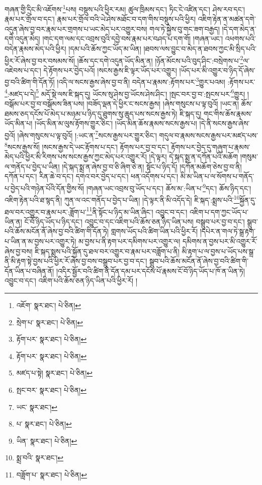 གཞན་གྱི་དྲིང་མི་འཇོགས་\footnote{འཇོག་  སྣར་ཐང་།  པེ་ཅིན། }པས། བསྡུས་པའི་ཕྱིར་རམ། ཚུལ་ཁྲིམས་དང་། ཏིང་ངེ་འཛིན་དང་། ཤེས་རབ་དང་། རྣམ་པར་གྲོལ་བ་དང་། རྣམ་པར་གྲོལ་བའི་ཡེ་ཤེས་མཐོང་བ་དག་གིས་བསྡུས་པའི་ཕྱིར། འཇིག་རྟེན་ན་མཚན་དགེ་འདུན་ཞེས་བྱ་བར་རྣམ་པར་གྲགས་པ་ཡང་མེད་པར་འགྱུར་བས། གལ་ཏེ་སྐྱེས་བུ་གང་ཟག་བརྒྱད། །དེ་དག་མེད་ན་དགེ་འདུན་མེད། །གང་དག་ལམ་དང་འབྲས་བུའི་དབྱེ་བས་རྣམ་པར་བཤད་པ་དག་གོ། །གཞན་ཡང་། འཕགས་པའི་བདེན་རྣམས་མེད་པའི་ཕྱིར། །དམ་པའི་ཆོས་ཀྱང་ཡོད་མ་ཡིན། །ཐབས་ལས་བྱུང་བ་མེད་ན་ཐབས་ཀྱང་མི་སྲིད་པའི་ཕྱིར་རོ་ཞེས་བྱ་བར་བསམས་སོ། །ཆོས་དང་དགེ་འདུན་ཡོད་མིན་ན། །ཉོན་མོངས་པའི་བུད་ཤིང་:བསྲེགས་པ་\footnote{སྲེག་པ་  སྣར་ཐང་།  པེ་ཅིན། }ལ་འཇེབས་པ་དང་། དེ་རྟོགས་པར་བྱེད་པའོ། །སངས་རྒྱས་ཇི་ལྟར་ཡོད་པར་འགྱུར། །ཡོད་པར་མི་འགྱུར་བ་ཉིད་དོ་ཞེས་བྱ་བའི་ཚིག་གི་དོན་ཏོ། །འདི་ལ་སངས་རྒྱས་ཞེས་བྱ་བ་ནི། བདེན་པ་རྣམས་:རྟོགས་པར་\footnote{རྟོག་པར་  སྣར་ཐང་།  པེ་ཅིན། }གྱུར་པའམ། :རྟོགས་པར་\footnote{རྟོག་པར་  སྣར་ཐང་།  པེ་ཅིན། }:མཛད་པ་དེ།\footnote{མཛད་པ་སྟེ།  སྣར་ཐང་།  པེ་ཅིན། } མདོ་སྡེ་ལས་ཇི་སྐད་དུ། ཡོངས་སུ་ཤེས་བྱ་ཡོངས་ཤེས་ཤིང་། །སྤང་བར་བྱ་བ་:སྤངས་པར་\footnote{སྤང་བར་  སྣར་ཐང་།  པེ་ཅིན། }གྱུར། །བསྒོམ་པར་བྱ་བ་བསྒོམས་ཟིན་པས། །བཟོད་ལྡན་དེ་ཕྱིར་ང་སངས་རྒྱས། །ཞེས་གསུངས་པ་ལྟ་བུའོ། །ཡང་ན། ཆོས་ཐམས་ཅད་དངོས་པོ་མེད་པ་མཉམ་པ་ཉིད་དུ་ཐུགས་སུ་ཆུད་པས་སངས་རྒྱས་ཏེ། ཇི་སྐད་དུ། གང་གིས་ཆོས་རྣམས་ཡོད་མིན་པ། །ཡོད་མིན་མ་ལུས་རྟོགས་གྱུར་ཅིང་། །ཡོད་མིན་ཆོས་རྣམས་སངས་རྒྱས་པ། །དེ་ནི་སངས་རྒྱས་ཞེས་བྱའོ། །ཞེས་གསུངས་པ་ལྟ་བུའོ། །:ཡང་ན་\footnote{ཡང་  སྣར་ཐང་། }སངས་རྒྱས་པར་གྱུར་ཅིང་། གདུལ་བ་རྣམས་སངས་རྒྱས་པར་མཛད་པས་\footnote{པ་  སྣར་ཐང་།  པེ་ཅིན། }སངས་རྒྱས་སོ། །སངས་རྒྱས་དེ་ཡང་རྟོགས་པ་དང་། རྟོགས་པར་བྱ་བ་དང་། རྟོགས་པར་བྱེད་དུ་གཞུག་པ་རྣམས་མེད་པའི་ཕྱིར་མི་རིགས་པས་སངས་རྒྱས་ཀྱང་མེད་པར་འགྱུར་རོ། །དེ་ལྟར། དེ་སྐད་སྨྲ་ན་དཀོན་པའི་མཆོག །གསུམ་ལ་གནོད་པ་བྱེད་པ་ཡིན། །དེ་སྐད་སྨྲ་ན་ཞེས་བྱ་བ་ཅི་ཞིག་ཅེ་ན། སྟོང་པ་ཉིད་དོ། །དཀོན་མཆོག་ཅེས་བྱ་བ་ནི། དཀོན་པ་དང་། རིན་ཆེ་བ་དང་། དགའ་བར་བྱེད་པ་དང་། ཕན་འདོགས་པ་དང་། མི་མ་ཡིན་པ་ལ་སོགས་པ་གནོད་པ་བྱེད་པའི་གཉེན་པོའི་དོན་གྱིས་སོ། །གཞན་ཡང་འབྲས་བུ་ཡོད་པ་དང་། ཆོས་མ་:ཡིན་པ་\footnote{ཡིན་  སྣར་ཐང་།  པེ་ཅིན། }དང་། ཆོས་ཉིད་དང་། འཇིག་རྟེན་པའི་ཐ་སྙད་ནི། ཀུན་ལ་འང་གནོད་པ་བྱེད་པ་ཡིན། །དེ་ལྟར་ནི་མི་འདོད་དེ། ཇི་སྐད་:སྨྲས་པའི་\footnote{སྨྲ་བའི་  སྣར་ཐང་། }སྐྱོན་དུ་ཐལ་བར་འགྱུར་བ་རྣམ་པར་:ཟློག་པ་\footnote{བཟློག་པ་  སྣར་ཐང་།  པེ་ཅིན། }ནི་སྟོང་པ་ཉིད་མ་ཡིན་ཞིང་། འབྱུང་བ་དང་། འཇིག་པ་དག་ཀྱང་ཡོད་པ་ཡིན་ན། ངོ་བོ་ཉིད་ཡོད་པ་ཉིད་དང་། འབྱུང་བ་དང་འཇིག་པའི་ཆོས་ཅན་ཉིད་ཡིན་པས། བསྒྲུབ་པར་བྱ་བ་དང་། སྒྲུབ་པའི་ཆོས་མངོན་ནོ་ཞེས་བྱ་བའི་ཚིག་གི་དོན་ཏེ། གླགས་ཡོད་པའི་ཚིག་ཡིན་པའི་ཕྱིར་རོ། །དཔེར་ན་གལ་ཏེ་སྒྲ་རྟག་པ་ཡིན་ན་མ་བྱས་པར་འགྱུར་ཏེ། མ་བྱས་པ་ནི་རྟག་པར་དམིགས་པར་འགྱུར་ལ། དམིགས་ན་བྱས་པར་མི་འགྱུར་རོ་ཞེས་བྱ་བས། ཇི་སྐད་སྨྲས་པའི་སྐྱོན་དུ་ཐལ་བར་འགྱུར་བ་རྣམ་པར་བཟློག་པ་ནི། མི་རྟག་པ་ལ་བྱས་པ་ཡོད་པས་སྒྲ་ནི་མི་རྟག་སྟེ་བྱས་པའི་ཕྱིར་རོ་ཞེས་བྱ་བས་བསྒྲུབ་པར་བྱ་བ་དང་། སྒྲུབ་པའི་ཆོས་མངོན་ནོ་ཞེས་བྱ་བའི་ཚིག་གི་དོན་ཡིན་པ་བཞིན་ནོ། །འདིར་སྦྱོར་བའི་ཚིག་ནི་དོན་དམ་པར་དངོས་པོ་རྣམས་ངོ་བོ་ཉིད་ཡོད་པ་ཁོ་ན་ཡིན་ཏེ། འབྱུང་བ་དང་། འཇིག་པའི་ཆོས་ཅན་ཉིད་ཡིན་པའི་ཕྱིར་རོ། །
